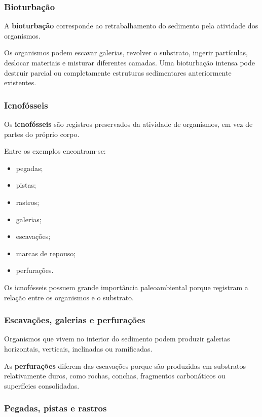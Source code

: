\documentclass[a4paper,12pt]{article}
\theoremstyle{definition}
\theoremstyle{definition}
\theoremstyle{definition}
\begin{document}
\subsubsection{Bioturbação}

A \textbf{bioturbação} corresponde ao retrabalhamento do sedimento pela atividade
dos organismos.

Os organismos podem escavar galerias, revolver o substrato, ingerir partículas,
deslocar materiais e misturar diferentes camadas. Uma bioturbação intensa pode
destruir parcial ou completamente estruturas sedimentares anteriormente
existentes.

\subsubsection{Icnofósseis}

Os \textbf{icnofósseis} são registros preservados da atividade de organismos, em
vez de partes do próprio corpo.

Entre os exemplos encontram-se:

\begin{itemize}
    \item pegadas;
    \item pistas;
    \item rastros;
    \item galerias;
    \item escavações;
    \item marcas de repouso;
    \item perfurações.
\end{itemize}

Os icnofósseis possuem grande importância paleoambiental porque registram a
relação entre os organismos e o substrato.

\subsubsection{Escavações, galerias e perfurações}

Organismos que vivem no interior do sedimento podem produzir galerias
horizontais, verticais, inclinadas ou ramificadas.

As \textbf{perfurações} diferem das escavações porque são produzidas em
substratos relativamente duros, como rochas, conchas, fragmentos carbonáticos ou
superfícies consolidadas.

\subsubsection{Pegadas, pistas e rastros}
\end{document}
